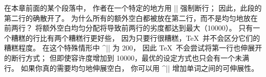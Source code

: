 %
{
\ddangerexercise 在本章前面的某个段落中，
作者在一个特定的地方用 |\break| 强制断行；
因此，此段的第二行的确散开了。\break
为什么所有的额外空白都被放在第二行，而不是均匀地放在前两行？
\answer 将额外空白均匀分配将导致前两行的劣度都达到最大（10000）。
只有一个糟糕的行比有两个糟糕行更好些，
因为只要行很糟糕，\TeX\ 并不会区分它们的糟糕程度。
在这个特殊情形中 ^|\tolerance| 为 200，
因此 \TeX\ 不会尝试将第一行也伸展开的断行方式；
但即使容许度增加到 10000，最优的设定方式也只会有一个未满行。
如果你真的需要均匀地伸展空白，
你可以用 ^|\spaceskip| 增加单词之间的可伸展性。

}
